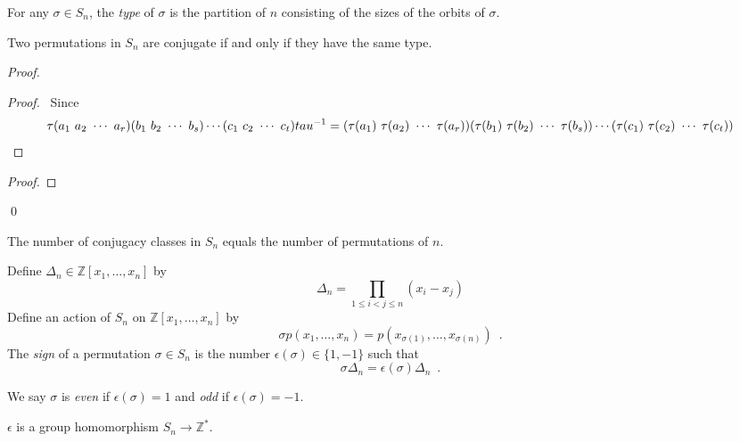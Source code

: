 \begin{df}[Type]
For any $\sigma \in S_n$, the \emph{type} of $\sigma$ is the partition of $n$ consisting of the sizes of the orbits of $\sigma$.
\end{df}

\begin{prop}
Two permutations in $S_n$ are conjugate if and only if they have the same type.
\end{prop}

\begin{proof}
\pf
{}
\begin{proof}
	\pf\ Since
	\[ \tau (a_1\ a_2\ \cdots\ a_r) (b_1\ b_2\ \cdots\ b_s) \cdots (c_1\ c_2\ \cdots\ c_t) \inv{tau} = (\tau(a_1)\ \tau(a_2)\ \cdots\ \tau(a_r)) (\tau(b_1)\ \tau(b_2)\ \cdots\ \tau(b_s)) \cdots (\tau(c_1)\ \tau(c_2)\ \cdots\ \tau(c_t)) \]
\end{proof}
\begin{proof}
\end{proof}
\qed
\end{proof}

\begin{cor}
The number of conjugacy classes in $S_n$ equals the number of permutations of $n$.
\end{cor}

\begin{df}[Sign]
Define $\Delta_n \in \mathbb{Z}[x_1, \ldots, x_n]$ by
\[ \Delta_n = \prod_{1 \leq i < j \leq n} (x_i - x_j) \]
Define an action of $S_n$ on $\mathbb{Z}[x_1, \ldots, x_n]$ by
\[ \sigma p(x_1, \ldots, x_n) = p(x_{\sigma(1)}, \ldots, x_{\sigma(n)}) \enspace . \]
The \emph{sign} of a permutation $\sigma \in S_n$ is the number $\epsilon(\sigma) \in \{ 1, -1 \}$ such that
\[ \sigma \Delta_n = \epsilon(\sigma) \Delta_n \enspace. \]

We say $\sigma$ is \emph{even} if $\epsilon(\sigma) = 1$ and \emph{odd} if $\epsilon(\sigma) = -1$.
\end{df}

\begin{prop}
$\epsilon$ is a group homomorphism $S_n \rightarrow \mathbb{Z}^*$.
\end{prop}

